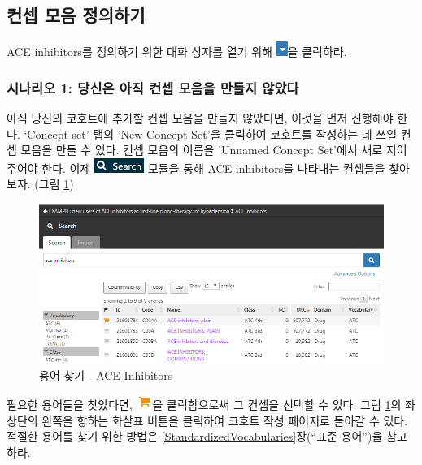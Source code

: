 \documentclass[11pt]{book}
\theoremstyle{definition}
\theoremstyle{definition}
\theoremstyle{definition}
\theoremstyle{remark}
\begin{document}
\subsection{컨셉 모음 정의하기}\label{--}

ACE inhibitors를 정의하기 위한 대화 상자를 열기 위해
\includegraphics{images/Cohorts/downarrow.png}을 클릭하라.

\subsubsection*{시나리오 1: 당신은 아직 컨셉 모음을 만들지
않았다}\label{-1------}

아직 당신의 코호트에 추가할 컨셉 모음을 만들지 않았다면, 이것을 먼저
진행해야 한다. `Concept set' 탭의 'New Concept Set'을 클릭하여 코호트를
작성하는 데 쓰일 컨셉 모음을 만들 수 있다. 컨셉 모음의 이름을 'Unnamed
Concept Set'에서 새로 지어 주어야 한다. 이제
\includegraphics{images/Cohorts/search-2.png} 모듈을 통해 ACE
inhibitors를 나타내는 컨셉들을 찾아보자. (그림 \ref{fig:aceinhibitors})

\begin{figure}

{\centering \includegraphics[width=1\linewidth]{images/Cohorts/aceinhibitors} 

}

\caption{용어 찾기 - ACE Inhibitors}\label{fig:aceinhibitors}
\end{figure}

필요한 용어들을 찾았다면,
\includegraphics{images/Cohorts/shoppingcart.png}을 클릭함으로써 그
컨셉을 선택할 수 있다. 그림 \ref{fig:aceinhibitors}의 좌상단의 왼쪽을
향하는 화살표 버튼을 클릭하여 코호트 작성 페이지로 돌아갈 수 있다.
적절한 용어를 찾기 위한 방법은 \ref{StandardizedVocabularies}장(``표준
용어'')을 참고하라.
\end{document}
